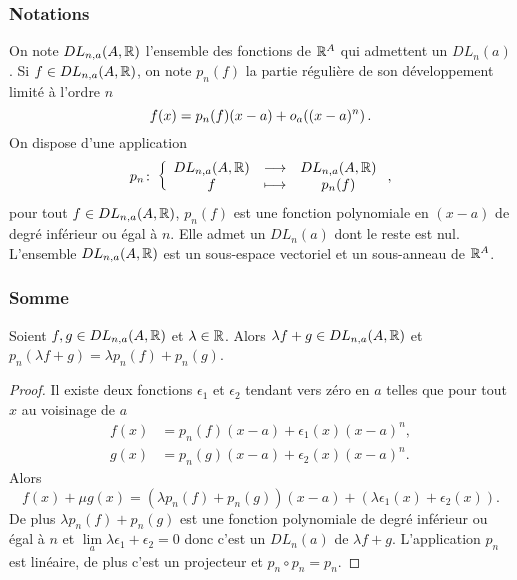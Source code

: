 \subsubsection{Notations}

On note \(DL_{n,a}(A,\mathbb{R})\) l'ensemble des fonctions de \(\mathbb{R}^A\) qui admettent un \(DL_n(a)\). Si \(f \in DL_{n,a}(A,\mathbb{R})\), on note \(p_n(f)\) la partie régulière de son développement limité à l'ordre \(n\)
\begin{equation}
  f(x)=p_n(f)(x-a)+o\mathopen{}_{a}\left((x-a)^n\right).
\end{equation}
On dispose d'une application
\begin{equation}
  p_n\colon \left\{\begin{array}{ccc} DL_{n,a}(A,\mathbb{R}) & \longrightarrow &DL_{n,a}(A,\mathbb{R})\\ f & \longmapsto & p_n(f) \end{array} \right.,
\end{equation}
pour tout \(f \in DL_{n,a}(A,\mathbb{R})\), \(p_n(f)\) est une fonction polynomiale en \((x-a)\) de degré inférieur ou égal à \(n\). Elle admet un \(DL_n(a)\) dont le reste est nul. L'ensemble \(DL_{n,a}(A,\mathbb{R})\) est un sous-espace vectoriel et un sous-anneau de \(\mathbb{R}^A\).

\subsubsection{Somme}

\begin{prop}[Linéarité]
  Soient \(f,g \in DL_{n,a}(A,\mathbb{R})\) et \(\lambda \in \mathbb{R}\). Alors \(\lambda f + g \in DL_{n,a}(A,\mathbb{R})\) et \(p_n(\lambda f +g)= \lambda p_n(f) +p_n(g)\).   
\end{prop}
\begin{proof}
  Il existe deux fonctions \(\epsilon_1\) et \(\epsilon_2\) tendant vers zéro en \(a\) telles que pour tout \(x\) au voisinage de \(a\)
  \begin{align}
    f(x) &= p_n(f)(x-a)+\epsilon_1(x)(x-a)^n, \\
    g(x) &= p_n(g)(x-a)+\epsilon_2(x)(x-a)^n. 
  \end{align}
  Alors
  \begin{equation}
    f(x)+\mu g(x) = (\lambda p_n(f)+p_n(g))(x-a)+(\lambda \epsilon_1(x) + \epsilon_2(x)).
  \end{equation}
  De plus \(\lambda p_n(f)+p_n(g)\) est une fonction polynomiale de degré inférieur ou égal à \(n\) et \(\lim\limits_{a} \lambda \epsilon_1 + \epsilon_2 =0\) donc c'est un \(DL_n(a)\) de \(\lambda f +g\). L'application \(p_n\) est linéaire, de plus c'est un projecteur et  \(p_n \circ p_n =p_n\).
\end{proof}

